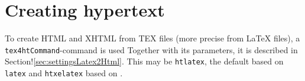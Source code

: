 















\section{Creating hypertext}\label{sec:tex2html}

To create HTML and XHTML from TEX files (more precise from \LaTeX{} files), 
a \texttt{tex4htCommand}-command is used 
Together with its parameters, 
it is described in Section!\ref{sec:settingsLatex2Html}. 
This may be \texttt{htlatex}, the default based on \texttt{latex} 
and \texttt{htxelatex} based on \xelatex. 

